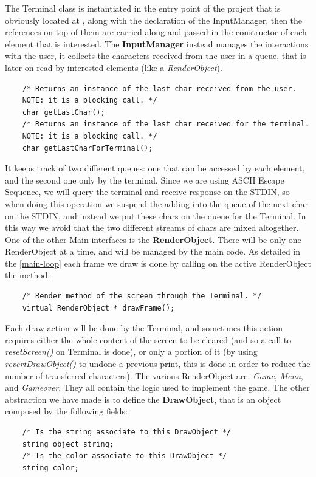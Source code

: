 \documentclass{article}
\begin{document}
The Terminal class is instantiated in the entry point of the project that is obviously located at , along with the declaration of the InputManager, then the references on top of them are carried along and passed in the constructor of each
element that is interested.
The \textbf{InputManager} instead manages the interactions with the user, it collects the characters received from the user in a queue, that is later on read by interested elements (like a \textit{RenderObject}).
\begin{verbatim}
    /* Returns an instance of the last char received from the user.
    NOTE: it is a blocking call. */
    char getLastChar();
    /* Returns an instance of the last char received for the terminal.
    NOTE: it is a blocking call. */
    char getLastCharForTerminal();
\end{verbatim}
It keeps track of two different queues: one that can be accessed by each element, and the second one only by the terminal. Since we are using ASCII Escape Sequence, we will query the terminal and receive response on the STDIN, so when doing this operation we suspend the adding into the queue of the next char on the STDIN,
and instead we put these chars on the queue for the Terminal. In this way we avoid that the two different streams of chars are mixed altogether.
One of the other Main interfaces is the \textbf{RenderObject}. There will be only one RenderObject at a time, and will be managed by the main code.
As detailed in the \ref{main-loop} each frame we draw is done by calling on the active RenderObject the method:
\begin{verbatim}
    /* Render method of the screen through the Terminal. */
    virtual RenderObject * drawFrame();
\end{verbatim}
Each draw action will be done by the Terminal, and sometimes this action requires either the whole content of the screen to be cleared (and so a call to \textit{resetScreen()} on Terminal is done), or only a portion of it (by using \textit{revertDrawObject()} to undone a previous print, this is done in order to reduce the number of transferred characters).
The various RenderObject are: \textit{Game}, \textit{Menu}, and \textit{Gameover}.
They all contain the logic used to implement the game.
The other abstraction we have made is to define the \textbf{DrawObject}, that is an object composed by the following fields:
\begin{verbatim}
    /* Is the string associate to this DrawObject */
    string object_string;
    /* Is the color associate to this DrawObject */
    string color;
\end{verbatim}
\end{document}

